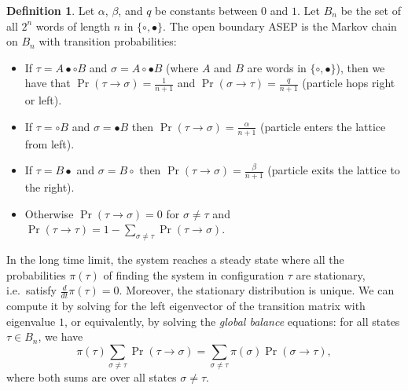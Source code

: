 \documentclass[11pt]{amsart}
\theoremstyle{definition}
\newtheorem{definition}[theorem]{Definition}
\theoremstyle{remark}
\newcommand{\ttt}{\tau}
\begin{document}
	\begin{definition}
	Let $\alpha$, $\beta$, and $q$ be constants  between $0$ and $1$.
Let $B_n$ be the set of all $2^n$ words of length $n$ in 
 $\{\circ, \bullet\}$.
The open boundary ASEP is the Markov chain on $B_n$ with
transition probabilities:
\begin{itemize}
	\item  If $\tau = A{\bullet}{\circ} B$ and
		$\sigma = A {\circ}{ \bullet} B$ (where $A$ and $ B$ are words
		in $\{\circ,\bullet\}$), then we have that 
		$\Pr(\tau\to \sigma) = \frac{1}{n+1}$ %
		and
		$\Pr(\sigma\to \tau) = \frac{q}{n+1}$ (particle hops right or left).
\item  If $\tau = \circ B$ and $\sigma = \bullet B$
	then $\Pr(\tau\to \sigma) = \frac{\alpha}{n+1}$ (particle enters the lattice from left).
\item  If $\tau = B \bullet$ and $\sigma = B \circ$
	then $\Pr(\tau\to \sigma) = \frac{\beta}{n+1}$ (particle exits the lattice to the right).
\item  Otherwise $\Pr(\tau\to \sigma) = 0$ for $\sigma \neq \tau$
	and $\Pr(\tau\to \tau) = 1 - \sum_{\sigma \neq \tau} \Pr(\tau\to \sigma)$.
\end{itemize}
\end{definition}

	



In the long time limit, the system reaches a steady state where all
the probabilities ${\pi}(\ttt)$ of finding
the system in configuration $\ttt$ are
stationary, i.e.\ satisfy
$	\frac{d}{dt} {\pi}(\tau) = 0.$
Moreover, the stationary distribution is unique.  We can compute it 
 by solving for the left eigenvector of the transition
matrix with eigenvalue $1$, or equivalently, by solving the 
\emph{global balance} equations: for all states $\tau\in B_n$, we have
\begin{equation*}
	\pi(\tau) \sum_{\sigma\neq \tau} \Pr(\tau\to \sigma) = 
	\sum_{\sigma\neq \tau} \pi(\sigma) \Pr(\sigma\to \tau),
\end{equation*}
where both sums are over all states $\sigma\neq \tau$.
\end{document}

